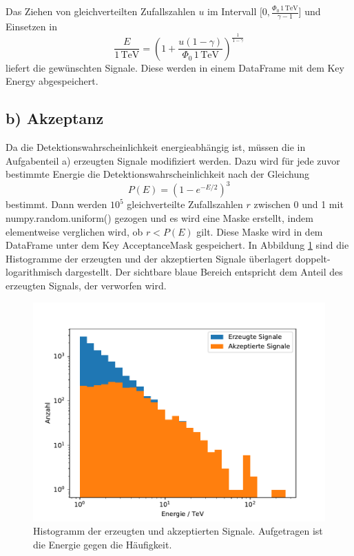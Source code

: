 \documentclass[a4paper, 11pt]{article}
\begin{document}
Das Ziehen von gleichverteilten Zufallszahlen $u$ im Intervall
$\lbrack 0, \frac{\Phi_0 \, 1\,\text{TeV}}{\gamma -1} \rbrack$ und Einsetzen in
\begin{equation}
  \frac{E}{1\,\text{TeV}}
  = \left(1+\frac{u (1-\gamma)}{\Phi_0\, 1\,\text{TeV}}\right)^{\frac{1}{1-\gamma}}
\end{equation}
liefert die gewünschten Signale. Diese werden in einem DataFrame mit dem Key
Energy abgespeichert.

\FloatBarrier
\subsection*{b) Akzeptanz}
Da die Detektionswahrscheinlichkeit energieabhängig ist, müssen die in Aufgabenteil
a) erzeugten Signale modifiziert werden.
Dazu wird für jede zuvor bestimmte Energie die Detektionswahrscheinlichkeit nach
der Gleichung
\begin{equation}
  P(E) = (1-e^{-E/2})^3
\end{equation}
bestimmt. Dann werden $10^5$ gleichverteilte Zufallszahlen $r$ zwischen 0 und 1
mit numpy.random.uniform() gezogen und es wird eine Maske erstellt, indem
elementweise verglichen wird, ob $r<P(E)$ gilt. Diese Maske wird in dem DataFrame
unter dem Key AcceptanceMask gespeichert.
In Abbildung \ref{fig:akzeptiertes-signal} sind die Histogramme der erzeugten und
der akzeptierten Signale überlagert doppelt-logarithmisch dargestellt. Der sichtbare
blaue Bereich entspricht dem Anteil des erzeugten Signals, der verworfen wird.
\begin{figure}
  \centering
  \includegraphics[width=\textwidth]{../A11/Energie.pdf}
  \caption{Histogramm der erzeugten und akzeptierten Signale. Aufgetragen ist die
  Energie gegen die Häufigkeit.}
  \label{fig:akzeptiertes-signal}
\end{figure}
\end{document}

